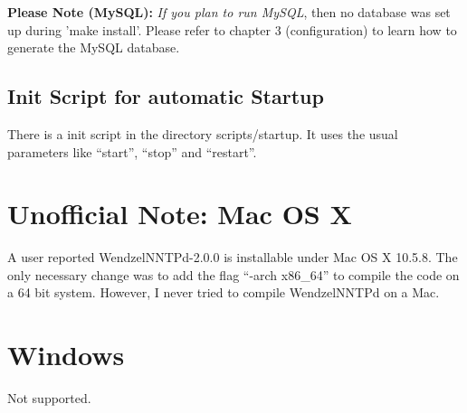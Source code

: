 \textbf{Please Note (MySQL):} \textit{If you plan to run MySQL}, then no database was set up during 'make install'. Please refer to chapter 3 (configuration) to learn how to generate the MySQL database.

\subsection{Init Script for automatic Startup}

There is a init script in the directory scripts/startup. It uses the usual parameters like ``start'', ``stop'' and ``restart''.

\section{Unofficial Note: Mac OS X}

A user reported WendzelNNTPd-2.0.0 is installable under Mac OS X 10.5.8. The only necessary change was to add the flag ``-arch x86\_64'' to compile the code on a 64 bit system. However, I never tried to compile WendzelNNTPd on a Mac.

\section{Windows}

Not supported.


